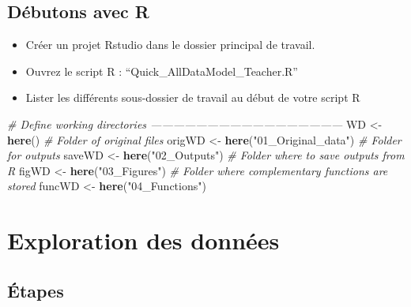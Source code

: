 \documentclass[french,a4paper]{article}
\newenvironment{Shaded}{\begin{snugshade}}{\end{snugshade}}
\newcommand{\CommentTok}[1]{\textcolor[rgb]{0.56,0.35,0.01}{\textit{#1}}}
\newcommand{\KeywordTok}[1]{\textcolor[rgb]{0.13,0.29,0.53}{\textbf{#1}}}
\newcommand{\NormalTok}[1]{#1}
\newcommand{\StringTok}[1]{\textcolor[rgb]{0.31,0.60,0.02}{#1}}
\providecommand{\tightlist}{%
  \setlength{\itemsep}{0pt}\setlength{\parskip}{0pt}}
\begin{document}
\hypertarget{debutons-avec-r}{%
\subsection{Débutons avec R}\label{debutons-avec-r}}

\begin{itemize}
\tightlist
\item
  Créer un projet Rstudio dans le dossier principal de travail.
\item
  Ouvrez le script R : ``Quick\_AllDataModel\_Teacher.R''
\item
  Lister les différents sous-dossier de travail au début de votre script
  R
\end{itemize}

\begin{Shaded}
\begin{Highlighting}[]
\CommentTok{# Define working directories ---------------------------------------------------}
\NormalTok{WD <-}\StringTok{ }\KeywordTok{here}\NormalTok{()}
\CommentTok{# Folder of original files}
\NormalTok{origWD <-}\StringTok{ }\KeywordTok{here}\NormalTok{(}\StringTok{"01_Original_data"}\NormalTok{)}
\CommentTok{# Folder for outputs}
\NormalTok{saveWD <-}\StringTok{ }\KeywordTok{here}\NormalTok{(}\StringTok{"02_Outputs"}\NormalTok{)}
\CommentTok{# Folder where to save outputs from R}
\NormalTok{figWD <-}\StringTok{ }\KeywordTok{here}\NormalTok{(}\StringTok{"03_Figures"}\NormalTok{)}
\CommentTok{# Folder where complementary functions are stored}
\NormalTok{funcWD <-}\StringTok{ }\KeywordTok{here}\NormalTok{(}\StringTok{"04_Functions"}\NormalTok{)}
\end{Highlighting}
\end{Shaded}

\hypertarget{exploration-des-donnees-1}{%
\section{Exploration des données}\label{exploration-des-donnees-1}}

\hypertarget{etapes}{%
\subsection{Étapes}\label{etapes}}

\end{document}
